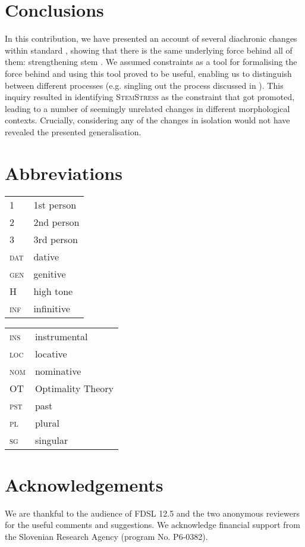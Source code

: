 \documentclass[output=paper,nonflat,colorlinks,citecolor=brown,newtxmath]{langsci/langscibook}
\begin{document}
\section{Conclusions} \label{sec:kager:6}

In this contribution, we have presented an account of several diachronic changes within standard , showing that there is the same underlying force behind all of them: strengthening stem . We assumed  constraints as a tool for formalising the force behind  and using this tool proved to be useful, enabling us to distinguish between different processes (e.g. singling out the process discussed in  ). This inquiry resulted in identifying \textsc{StemStress} as the constraint that got promoted, leading to a number of seemingly unrelated changes in different morphological contexts. Crucially, considering any of the changes in isolation would not have revealed the presented generalisation.

\section*{Abbreviations}

\begin{tabularx}{.45\textwidth}{lX}
\textsc{1}&1st person\\
\textsc{2}&2nd person\\
\textsc{3}&3rd person\\
\textsc{dat}&{dative}\\
\textsc{gen}&genitive\\
H&{high tone}\\
\textsc{inf}&{infinitive}\\
\end{tabularx}
\begin{tabularx}{.45\textwidth}{lX}
\textsc{ins}&instrumental\\
\textsc{loc}&locative\\
\textsc{nom}&nominative\\
{OT}&Optimality Theory\\
\textsc{\textsc{pst}}&past\\
\textsc{pl}&plural\\
\textsc{sg}&singular\\
\end{tabularx}

\section*{Acknowledgements}

We are thankful to the audience of FDSL 12.5 and the two anonymous reviewers for the useful comments and suggestions. We acknowledge financial support from the Slovenian Research Agency (program No. P6-0382).


\sloppy
\printbibliography[heading=subbibliography,notkeyword=this]

\end{document}
